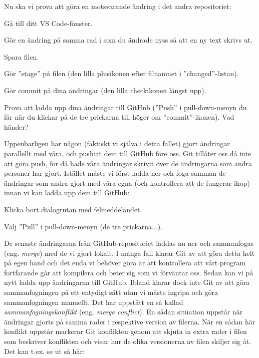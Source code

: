 \begin{Datorarbete}
	Nu ska vi prova att göra en motsvarande ändring i det andra repositoriet:
	\begin{Deluppgifter}
		\item Gå till ditt VS Code-fönster.
		\item Gör en ändring på samma rad i  som du ändrade nyss så att en ny text skrivs ut.
		\item Spara filen.
		\item Gör ''stage'' på filen (den lilla plusikonen efter filnamnet i ''changed''-listan).
		\item Gör commit på dina ändringar (den lilla checkikonen längst upp).
		\item Prova att ladda upp dina ändringar till GitHub (''Push'' i pull-down-menyn du får när du klickar på de tre prickarna till höger om ''commit''-ikonen). Vad händer?
	\end{Deluppgifter}

	Uppenbarligen har någon (faktiskt vi själva i detta fallet) gjort ändringar parallellt med våra, och push:at dem till GitHub före oss. Git tillåter oss då inte att göra push, för då hade våra ändringar skrivit över de ändringarna som andra personer har gjort.	Istället måste vi först ladda ner och foga samman de ändringar som andra gjort med våra egna (och kontrollera att de fungerar ihop) innan vi kan ladda upp dem till GitHub:

	\begin{Deluppgifter}
		\item Klicka bort dialogrutan med felmeddelandet.
		\item Välj ''Pull'' i pull-down-menyn (de tre prickarna...).
	\end{Deluppgifter}

	De senaste ändringarna från GitHub-repositoriet laddas nu ner och sammanfogas (eng. \emph{merge}) med de vi gjort lokalt. I många fall klarar Git av att göra detta helt på egen hand och det enda vi behöver göra är att kontrollera att vårt program fortfarande går att kompilera och beter sig som vi förväntar oss. Sedan kan vi på nytt ladda upp ändringarna till GitHub. Ibland  klarar dock inte Git av att göra sammanfogningen på ett entydigt sätt utan vi måste ingripa och göra sammanfogningen manuellt. Det har uppstått en så kallad \emph{sammanfogningskonflikt} (eng. \emph{merge conflict}). En sådan situation uppstår när ändringar gjorts på samma rader i respektive version av filerna. När en sådan här konflikt uppstår markerar Git konflikten genom att skjuta in extra rader i filen som beskriver konflikten och visar hur de olika versionerna av filen skiljer sig åt. Det kan t.ex. se ut så här:


\end{Datorarbete}
